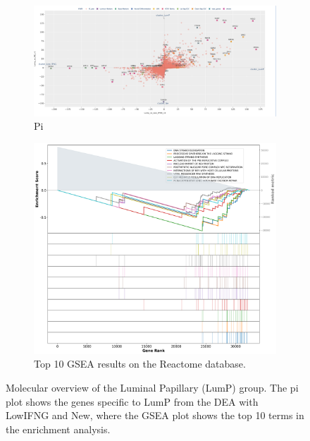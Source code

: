 \begin{figure}[H]
    \centering
    \begin{subfigure}[!t]{0.79\textwidth}
        \includegraphics[width=\textwidth,keepaspectratio]{Sections/ClusteringAnalysis/Resources/discussion/other_groups/lump_pi.png}    
        \caption{Pi}
        \label{fig:cs:lumP_pi}
    \end{subfigure}
    \centering
    \begin{subfigure}[!t]{0.69\textwidth}
        \includegraphics[width=\textwidth, keepaspectratio]{Sections/ClusteringAnalysis/Resources/discussion/other_groups/lumP2_reactome_10_top.png}
        \caption{Top 10 GSEA results on the Reactome database.}
        \label{fig:cs:lumP_gsea}
    \end{subfigure} 
    \centering
    \caption{Molecular overview of the Luminal Papillary (LumP) group. The pi plot shows the genes specific to LumP from the DEA with LowIFNG and New, where the GSEA plot shows the top 10 terms in the enrichment analysis.} 
    \label{fig:cs:lump}
\end{figure}


